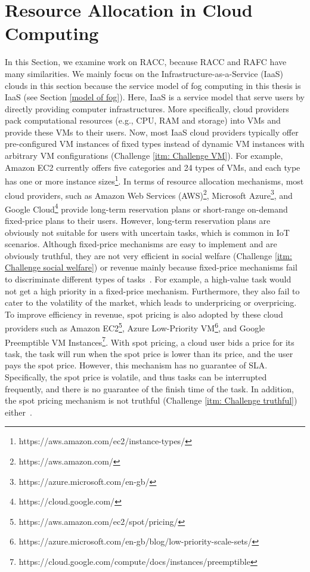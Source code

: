 \documentclass[11pt]{phdthesis}
\begin{document}
\section{Resource Allocation in Cloud Computing} \label{resource-allocation-in-cloud-computing}
In this Section, we examine work on RACC, because RACC and RAFC have many similarities. We mainly focus on the Infrastructure-as-a-Service (IaaS) clouds in this section because the service model of fog computing in this thesis is IaaS (see Section \ref{model of fog}). Here, IaaS is a service model that serve users by directly providing computer infrastructures. More specifically, cloud providers pack computational resources (e.g., CPU, RAM and storage) into VMs and provide these VMs to their users. Now, most IaaS cloud providers typically offer pre-configured VM instances of fixed types instead of dynamic VM instances with arbitrary VM configurations (Challenge \ref{itm: Challenge VM}). For example, Amazon EC2 currently offers five categories and 24 types of VMs, and each type has one or more instance sizes\footnote{https://aws.amazon.com/ec2/instance-types/}. In terms of resource allocation mechanisms, most cloud providers, such as Amazon Web Services (AWS)\footnote{https://aws.amazon.com/}, Microsoft Azure\footnote{https://azure.microsoft.com/en-gb/}, and Google Cloud\footnote{https://cloud.google.com/} provide long-term reservation plans or short-range on-demand fixed-price plans to their users. However, long-term reservation plans are obviously not suitable for users with uncertain tasks, which is common in IoT scenarios.  Although fixed-price mechanisms are easy to implement and are obviously truthful, they are not very efficient in social welfare (Challenge \ref{itm: Challenge social welfare}) or revenue mainly because fixed-price mechanisms fail to discriminate different types of tasks~\citep{al2013cloud}. For example, a high-value task would not get a high priority in a fixed-price mechanism. Furthermore, they also fail to cater to the volatility of the market, which leads to underpricing or overpricing. To improve efficiency in revenue, spot pricing is also adopted by these cloud providers such as
Amazon EC2\footnote{https://aws.amazon.com/ec2/spot/pricing/}, Azure Low-Priority VM\footnote{https://azure.microsoft.com/en-gb/blog/low-priority-scale-sets/}, and Google Preemptible VM Instances\footnote{https://cloud.google.com/compute/docs/instances/preemptible}. With spot pricing, a cloud user bids a price for its task, the task will run when the spot price is lower than its price, and the user pays the spot price. However, this mechanism has no guarantee of SLA. Specifically, the spot price is volatile, and thus tasks can be interrupted frequently, and there is no guarantee of the finish time of the task. In addition, the spot pricing mechanism is not truthful (Challenge \ref{itm: Challenge truthful}) either~\citep{wang2012cloud}.
\end{document}
